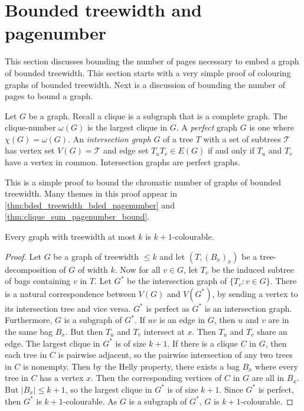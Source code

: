 
\section{Bounded treewidth and pagenumber}\label{sec:Bounded_Treewidth}

This section discusses bounding the number of pages necessary to embed a graph of bounded treewidth. This section starts with a very simple proof of colouring graphs of bounded treewidth. Next is a discussion of bounding the number of pages to bound a graph. 

Let $G$ be a graph. Recall a clique is a subgraph that is a complete graph. The clique-number $\omega(G)$ is the largest clique in $G$. A \textit{perfect} graph $G$ is one where $\chi(G) = \omega(G)$. An \textit{intersection graph} $G$ of a tree $T$ with a set of subtrees $\mathcal{T}$ has vertex set $V(G) = \mathcal{T}$ and edge set $T_u T_v \in E(G)$ if and only if $T_u$ and $T_v$ have a vertex in common. Intersection graphs are perfect graphs. 

This is a simple proof to bound the chromatic number of graphs of bounded treewidth. Many themes in this proof appear in \cref{thm:bded_treewidth_bded_pagenumber} and \cref{thm:clique_sum_pagenumber_bound}. 
\begin{theorem}
	Every graph with treewidth at most $k$ is $k + 1$-colourable.
\end{theorem}

\begin{proof}
	Let $G$ be a graph of treewidth $\leq k$ and let $(T, (B_x)_x)$ be a tree-decomposition of $G$ of width $k$. Now for all $v \in G$, let $T_v$ be the induced subtree of bags containing $v$ in $T$. Let $G^*$ be the intersection graph of $\{T_v : v \in G\}$. There is a natural correspondence between $V(G)$ and $V(G^*)$, by sending a vertex to its intersection tree and vice versa. $G^*$ is perfect as $G^*$ is an intersection graph. Furthermore, $G$ is a subgraph of $G^*$. If $uv$ is an edge in $G$, then $u$ and $v$ are in the same bag $B_x$. But then $T_u$ and $T_v$ intersect at $x$. Then $T_u$ and $T_v$ share an edge. The largest clique in $G^*$ is of size $k + 1$. If there is a clique $C$ in $G$, then each tree in $C$ is pairwise adjacent, so the pairwise intersection of any two trees in $C$ is nonempty. Then by the Helly property, there exists a bag $B_x$ where every tree in $C$ has a vertex $x$. Then the corresponding vertices of $C$ in $G$ are all in $B_x$. But $|B_x| \leq k + 1$, so the largest clique in $G^*$ is of size $k + 1$. Since $G^*$ is perfect, then $G^*$ is $k + 1$-colourable. As $G$ is a subgraph of $G^*$, $G$ is $k + 1$-colourable. 
\end{proof}

